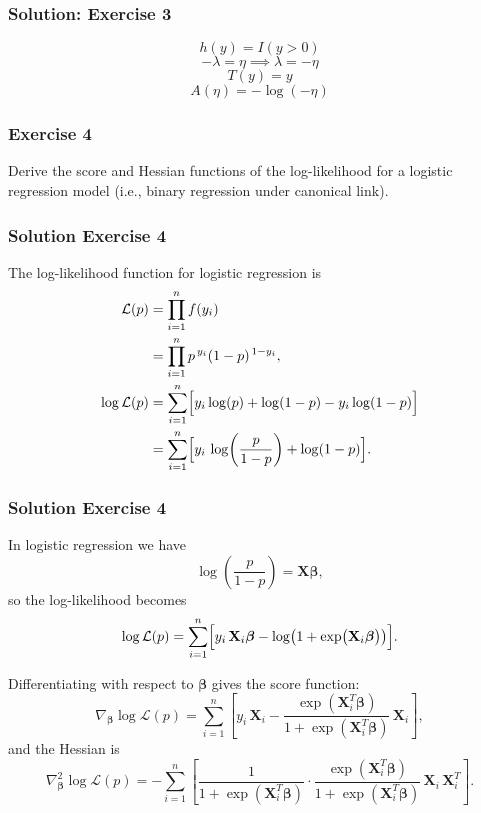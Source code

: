 \documentclass{beamer}
\begin{document}
\begin{frame}
\frametitle{Solution: Exercise 3}



$$h(y) = I(y > 0)$$
$$ - \lambda = \eta \implies \lambda = -\eta $$
$$T(y) = y $$
$$A(\eta) = - \log(-\eta) $$

\end{frame}



\begin{frame}
\frametitle{Exercise 4}

Derive the score and Hessian functions of the log-likelihood for a logistic regression model (i.e., binary regression under canonical link).

\end{frame}

\begin{frame}
\frametitle{Solution Exercise 4}

The log-likelihood function for logistic regression is
\[
\begin{aligned}
\mathcal{L}(p) &= \prod_{i=1}^n f(y_i) \\
&= \prod_{i=1}^n p^{\,y_i}(1-p)^{\,1-y_i}, \\
\log\mathcal{L}(p) &= \sum_{i=1}^n \Bigl[ y_i\log(p) + \log(1-p) - y_i\log(1-p) \Bigr] \\
&= \sum_{i=1}^n \Bigl[ y_i\,\log\!\left(\frac{p}{1-p}\right) + \log(1-p) \Bigr].
\end{aligned}
\]

\end{frame}

\begin{frame}
\frametitle{Solution Exercise 4}
In logistic regression we have
\[
\log\!\left(\frac{p}{1-p}\right) = \mathbf{X}\boldsymbol\beta,
\]
so the log-likelihood becomes
\[
\log\mathcal{L}(p) = \sum_{i=1}^n \Bigl[ y_i\,\mathbf{X}_i\boldsymbol\beta - \log\!\left(1+\exp\bigl(\mathbf{X}_i\boldsymbol\beta\bigr)\right) \Bigr].
\]




Differentiating with respect to \(\boldsymbol\beta\) gives the score function:
\[
\nabla_{\boldsymbol\beta} \log\mathcal{L}(p) = \sum_{i=1}^n \left[ y_i\,\mathbf{X}_i - \frac{\exp(\mathbf{X}_i^T\boldsymbol\beta)}{1+\exp(\mathbf{X}_i^T\boldsymbol\beta)}\,\mathbf{X}_i \right],
\]
and the Hessian is
\[
\nabla^2_{\boldsymbol\beta} \log\mathcal{L}(p) = -\sum_{i=1}^n \left[ \frac{1}{1+\exp(\mathbf{X}_i^T\boldsymbol\beta)} \cdot \frac{\exp(\mathbf{X}_i^T\boldsymbol\beta)}{1+\exp(\mathbf{X}_i^T\boldsymbol\beta)}\,\mathbf{X}_i\,\mathbf{X}_i^T \right].
\]


\end{frame}
\end{document}
